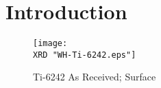 \chapter{Introduction}
\begin{figure}[H]
    \centering
        \texttt{[image: \\XRD "WH-Ti-6242.eps"]}
        \caption{Ti-6242 As Received; Surface}
    \label{fig:EDM-Cut}
\end{figure}

